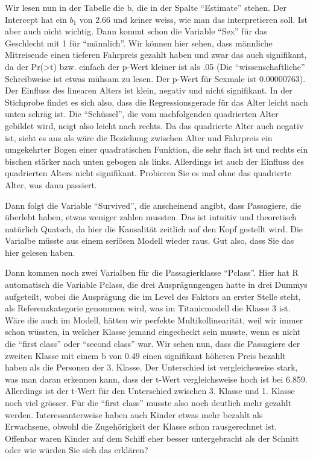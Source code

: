 \documentclass[
  10pt,
  letterpaper,
  a4paper, twoside]{scrreprt}
\begin{document}
Wir lesen nun in der Tabelle die b, die in der Spalte \enquote{Estimate}
stehen. Der Intercept hat ein \(b_1\) von 2.66 und keiner weiss, wie man
das interpretieren soll. Ist aber auch nicht wichtig. Dann kommt schon
die Variable \enquote{Sex} für das Geschlecht mit 1 für
\enquote{männlich}. Wir können hier sehen, dass männliche Mitreisende
einen tieferen Fahrpreis gezahlt haben und zwar das auch signifikant, da
der Pr(\textgreater\textbar t\textbar) bzw. einfach der p-Wert kleiner
ist als .05 (Die \enquote{wissenschaftliche} Schreibweise ist etwas
mühsam zu lesen. Der p-Wert für Sexmale ist 0.00000763). Der Einfluss
des linearen Alters ist klein, negativ und nicht signifikant. In der
Stichprobe findet es sich also, dass die Regressionsgerade für das Alter
leicht nach unten schräg ist. Die \enquote{Schüssel}, die vom
nachfolgenden quadrierten Alter gebildet wird, neigt also leicht nach
rechts. Da das quadrierte Alter auch negativ ist, sieht es aus als wäre
die Beziehung zwischen Alter und Fahrpreis ein umgekehrter Bogen einer
quadratischen Funktion, die sehr flach ist und rechts ein bischen
stärker nach unten gebogen als links. Allerdings ist auch der Einfluss
des quadrierten Alters nicht signifikant. Probieren Sie es mal ohne das
quadrierte Alter, was dann passiert.

Dann folgt die Variable \enquote{Survived}, die anscheinend angibt, dass
Passagiere, die überlebt haben, etwas weniger zahlen mussten. Das ist
intuitiv und theoretisch natürlich Quatsch, da hier die Kausalität
zeitlich auf den Kopf gestellt wird. Die Varialbe müsste aus einem
seriösen Modell wieder raus. Gut also, dass Sie das hier gelesen haben.

Dann kommen noch zwei Varialben für die Passagierklasse
\enquote{Pclass}. Hier hat R automatisch die Variable Pclass, die drei
Ausprägungengen hatte in drei Dummys aufgeteilt, wobei die Ausprägung
die im Level des Faktors an erster Stelle steht, als Referenzkategorie
genommen wird, was im Titanicmodell die Klasse 3 ist. Wäre die auch im
Modell, hätten wir perfekte Multikollinearität, weil wir immer schon
wüssten, in welcher Klasse jemand eingecheckt sein musste, wenn es nicht
die \enquote{first class} oder \enquote{second class} war. Wir sehen
nun, dass die Passagiere der zweiten Klasse mit einem b von 0.49 einen
signifikant höheren Preis bezahlt haben als die Personen der 3. Klasse.
Der Unterschied ist vergleichsweise stark, was man daran erkennen kann,
dass der t-Wert vergleichsweise hoch ist bei 6.859. Allerdings ist der
t-Wert für den Unterschied zwischen 3. Klasse und 1. Klasse noch viel
grösser. Für die \enquote{first class} musste also noch deutlich mehr
gezahlt werden. Interessanterweise haben auch Kinder etwas mehr bezahlt
als Erwachsene, obwohl die Zugehörigkeit der Klasse schon rausgerechnet
ist. Offenbar waren Kinder auf dem Schiff eher besser untergebracht als
der Schnitt oder wie würden Sie sich das erklären?
\end{document}
